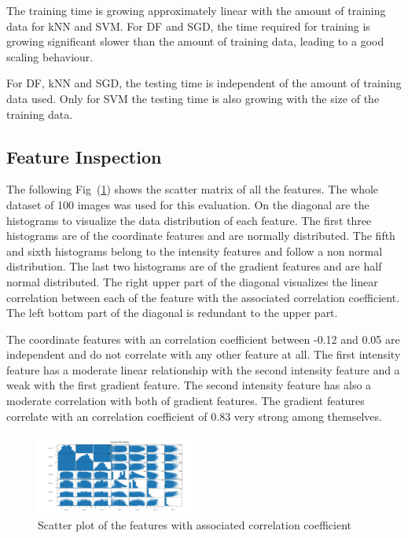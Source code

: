 \documentclass[journal]{IEEEtran}
\begin{document}
The training time is growing approximately linear with the amount of training data for kNN and SVM. For DF and SGD, the time required for training is growing significant slower than the amount of training data, leading to a good scaling behaviour.

For DF, kNN and SGD, the testing time is independent of the amount of training data used. Only for SVM the testing time is also growing with the size of the training data.

\subsection{Feature Inspection}


The following Fig~(\ref{scatterplot}) shows the scatter matrix of all the features. The whole dataset of 100 images was used for this evaluation. On the diagonal are the histograms to visualize the data distribution of each feature. The first three histograms are of the coordinate features and are normally distributed. The fifth and sixth histograms belong to the intensity features and follow a non normal distribution. The last two histograms are of the gradient features and are half normal distributed. The right upper part of the diagonal visualizes the linear correlation between each of the feature with the associated correlation coefficient. The left bottom part of the diagonal is redundant to the upper part. 

The coordinate features with an correlation coefficient between -0.12 and 0.05 are independent and do not correlate with any other feature at all. The first intensity feature has a moderate linear relationship with the second intensity feature and a weak with the first gradient feature. The second intensity feature has also a moderate correlation with both of gradient features. The gradient features correlate with an correlation coefficient of 0.83 very strong among themselves.


\begin{figure}[h]
	\centering
	\includegraphics[width=0.48\textwidth]{images/ScatterPlotMatrix}
	\caption{Scatter plot of the features with associated correlation coefficient}
	\label{scatterplot}
\end{figure}
\end{document}
